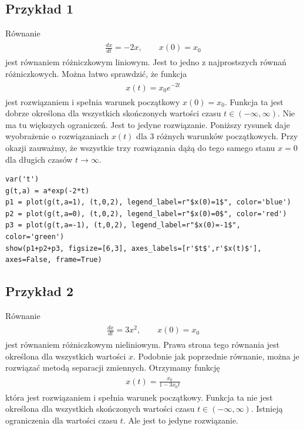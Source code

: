 \documentclass[a4paper,12pt,polish]{sphinxmanual}
\begin{document}
\subsection{Przykład 1}
\label{ch1/chI012:przyklad-1}
Równanie
\label{ch1/chI012:equation-eqn1}\begin{gather}
\begin{split}\frac{dx}{dt}=-2x, \qquad x(0) = x_0\end{split}\label{ch1/chI012-eqn1}
\end{gather}
jest równaniem różniczkowym liniowym. Jest to jedno z najprostszych równań różniczkowych.  Można łatwo sprawdzić, że funkcja
\label{ch1/chI012:equation-eqn2}\begin{gather}
\begin{split}x(t) = x_0   e^{-2t}\end{split}\label{ch1/chI012-eqn2}
\end{gather}
jest rozwiązaniem i spełnia warunek początkowy $x(0) = x_0$. Funkcja ta jest dobrze określona dla wszystkich skończonych  wartości czasu $t \in (-\infty, \infty)$.  Nie ma tu większych ograniczeń.  Jest to jedyne rozwiązanie.  Poniższy rysunek daje wyobrażenie o rozwiązaniach $x(t)$ dla 3 różnych warunków początkowych. Przy okazji zauważmy, że wszystkie trzy rozwiązania dążą do tego samego stanu $x=0$  dla długich czasów $t\to \infty$.


\begin{verbatim}
var('t')
g(t,a) = a*exp(-2*t)
p1 = plot(g(t,a=1), (t,0,2), legend_label=r"$x(0)=1$", color='blue')
p2 = plot(g(t,a=0), (t,0,2), legend_label=r"$x(0)=0$", color='red')
p3 = plot(g(t,a=-1), (t,0,2), legend_label=r"$x(0)=-1$", color='green')
show(p1+p2+p3, figsize=[6,3], axes_labels=[r'$t$',r'$x(t)$'], axes=False, frame=True)
\end{verbatim}



\subsection{Przykład 2}
\label{ch1/chI012:przyklad-2}
Równanie
\label{ch1/chI012:equation-eqn3}\begin{gather}
\begin{split}\frac{dx}{dt}= 3 x^2, \qquad x(0) = x_0\end{split}\label{ch1/chI012-eqn3}
\end{gather}
jest równaniem różniczkowym nieliniowym.   Prawa strona tego równania jest określona dla wszystkich wartości $x$. Podobnie jak poprzednie równanie, można  je rozwiązać metodą separacji zmiennych. Otrzymamy funkcję
\label{ch1/chI012:equation-eqn4}\begin{gather}
\begin{split}x(t) = \frac{x_0}{1-3 x_0 t}\end{split}\label{ch1/chI012-eqn4}
\end{gather}
która jest rozwiązaniem i spełnia warunek początkowy. Funkcja ta nie jest określona dla wszystkich skończonych  wartości czasu $t \in (-\infty, \infty)$.  Istnieją  ograniczenia dla wartości czasu $t$. Ale jest to jedyne rozwiązanie.
\end{document}
